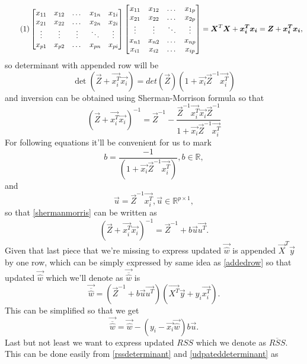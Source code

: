 \[ \numberthis \label{addedrow}
\begin{bmatrix}
	x_{11} & x_{12} & \dots  & x_{1n} & x_{1i}  \\
	x_{21} & x_{22} & \dots  & x_{2n} & x_{2i} \\
	\vdots & \vdots & \vdots & \ddots & \vdots \\
	x_{p1} & x_{p2} & \dots  & x_{pn} & x_{pi} 	
\end{bmatrix}
\begin{bmatrix}
	x_{11} & x_{12}  & \dots  & x_{1p} \\
	x_{21} & x_{22}  & \dots  & x_{2p} \\
	\vdots  & \vdots & \ddots & \vdots \\
	x_{n1} & x_{n2}  & \dots  & x_{np} \\
	x_{i1} & x_{i2}  & \dots  & x_{ip}
\end{bmatrix}
 = \vec{X}^T\vec{X} + \vec{x_i^T}\vec{x_i} = \vec{Z} + \vec{x_i^T}\vec{x_i},
\]
so determinant with appended row will be
\begin{equation} \label{udpateddeterminant}
	\det(\vec{Z} + \vec{x_i^T}\vec{x_i}) = det(\vec{Z})(1 + \vec{x_i}\vec{Z}^{-1}\vec{x_i^T})
\end{equation}
and inversion can be obtained using Sherman-Morrison formula \cite{bartlett1951inverse} so that 
\begin{equation} \label{shermanmorris}
	(\vec{Z} + \vec{x_i^T}\vec{x_i})^{-1} = \vec{Z}^{-1} - \dfrac{\vec{Z}^{-1}\vec{x_i^T}\vec{x_i}\vec{Z}^{-1}}{1 + \vec{x_i}\vec{Z}^{-1}\vec{x_i^T}}
\end{equation}
For following equations it'll be convenient for us to mark 
\begin{equation}
	b = \dfrac{-1}{(1 + \vec{x_i}\vec{Z}^{-1}\vec{x_i^T})},  b \in \mathbb{R},
\end{equation}
and 
\begin{equation}
	\vec{u} = \vec{Z}^{-1}\vec{x_i^T},  	\vec{u} \in \mathbb{R}^{p \times 1},
\end{equation}
so that \ref{shermanmorris} can be written as
\begin{equation}
	(\vec{Z} + \vec{x_i^T}\vec{x_i})^{-1} = \vec{Z}^{-1} + b\vec{u}\vec{u^T}.
\end{equation}
Given that last piece that we're missing to express updated $\vec{\hat{w}}$ is appended $\vec{X}^T\vec{y}$ by one row, which can be simply expressed by same idea as \ref{addedrow} so that updated $\vec{\hat{w}}$ which we'll denote as $\vec{\overline{\hat{w}}}$ is 
\begin{equation}
	\vec{\overline{\hat{w}}} = (\vec{Z}^{-1} + b\vec{u}\vec{u^T})(\vec{X^T}\vec{y} + y_i\vec{x_i^T}).
\end{equation}
This can be simplified so that we get
\begin{equation}
	\vec{\overline{\hat{w}}} = \vec{\hat{w}} - (y_i - \vec{x_i}\vec{\hat{w}})b\vec{u}.
\end{equation}
Last but not least we want to express updated $RSS$ which we denote as $\overline{RSS}$. This can be done easily from \ref{rssdeterminant} and \ref{udpateddeterminant} as 

